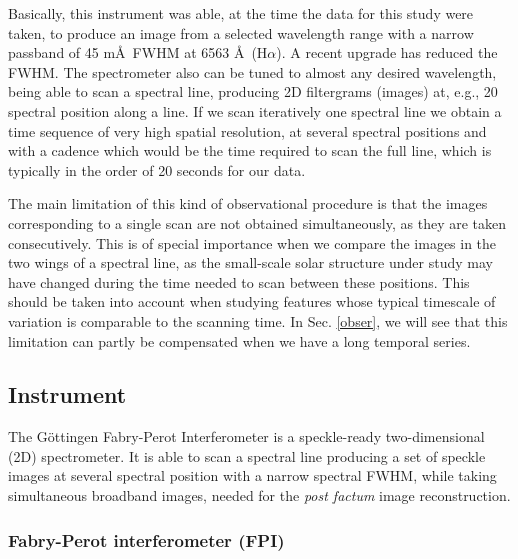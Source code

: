 Basically, this instrument was able, at the time the data for this study were taken, to produce an image from a selected wavelength range with a narrow passband of 45 m\AA\, 
FWHM at 6563 \AA\, (H$\alpha$). A recent upgrade has reduced the FWHM. The spectrometer also can be tuned to almost any desired wavelength, being able to scan a spectral line, producing 2D filtergrams (images) at, e.g., 20 spectral position along a line. If we scan iteratively one spectral line we obtain a time sequence of very high spatial resolution, at several spectral positions and with a cadence which would be the time required to scan the full line, which is typically in the order of 20 seconds for our data.

The main limitation of this kind of observational procedure is that the images corresponding to a single scan are not obtained simultaneously, as they are taken consecutively. This is of special importance when we compare the images in the two wings of a spectral line, as the small-scale solar structure under study may have changed during the time needed to scan between these positions. This should be taken into account when studying features whose typical timescale of variation is comparable to the scanning time. In Sec. \ref{obser}, we will see that this limitation can partly be  compensated when we have a long temporal series.

\subsection{Instrument\label{obs:fpi}}
The G\"ottingen Fabry-Perot Interferometer \citep{1995A&AS..112..371B,volkmer95,2001A&A...365..588K,2006A&A...451.1151P} is a speckle-ready two-dimensional (2D) spectrometer. It is able to scan a spectral line producing a set of speckle images at several spectral position with a narrow spectral FWHM, while taking simultaneous broadband images, needed for the {\em post factum} image reconstruction.

\subsubsection*{Fabry-Perot interferometer (FPI)}

